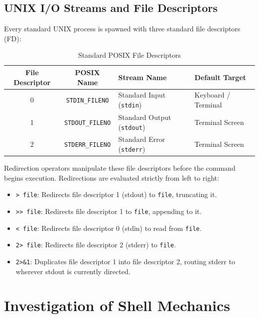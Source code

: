 \documentclass[12pt,a4paper]{article}
\begin{document}
\subsection{UNIX I/O Streams and File Descriptors}
Every standard UNIX process is spawned with three standard file descriptors (FD):
\begin{table}[H]
\centering
\caption{Standard POSIX File Descriptors}
\label{tab:file_descriptors}
\begin{tabular}{ccll}
\toprule
\textbf{File Descriptor} & \textbf{POSIX Name} & \textbf{Stream Name} & \textbf{Default Target} \\
\midrule
0 & \texttt{STDIN\_FILENO}  & Standard Input (\texttt{stdin})   & Keyboard / Terminal \\
1 & \texttt{STDOUT\_FILENO} & Standard Output (\texttt{stdout}) & Terminal Screen \\
2 & \texttt{STDERR\_FILENO} & Standard Error (\texttt{stderr})  & Terminal Screen \\
\bottomrule
\end{tabular}
\end{table}

Redirection operators manipulate these file descriptors before the command begins execution. Redirections are evaluated strictly from left to right:
\begin{itemize}
    \item \texttt{> file}: Redirects file descriptor 1 (stdout) to \texttt{file}, truncating it.
    \item \texttt{>> file}: Redirects file descriptor 1 to \texttt{file}, appending to it.
    \item \texttt{< file}: Redirects file descriptor 0 (stdin) to read from \texttt{file}.
    \item \texttt{2> file}: Redirects file descriptor 2 (stderr) to \texttt{file}.
    \item \texttt{2>\&1}: Duplicates file descriptor 1 into file descriptor 2, routing stderr to wherever stdout is currently directed.
\end{itemize}

\section{Investigation of Shell Mechanics}
\end{document}
